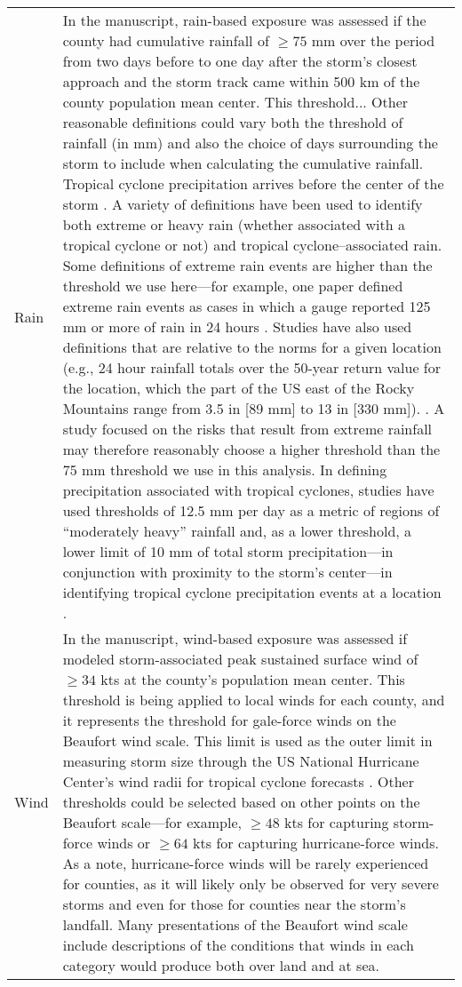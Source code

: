 \begin{table}
\begin{tabular}{lp{40em}}
Rain & In the manuscript, rain-based exposure was assessed if the county had cumulative rainfall of $\ge75$ mm over the period from two days before to one day after the storm’s closest approach and the storm track came within 500 km of the county population mean center. This threshold... Other reasonable definitions could vary both the threshold of rainfall (in mm) and also the choice of days surrounding the storm to include when calculating the cumulative rainfall. Tropical cyclone precipitation arrives before the center of the storm \cite{zhou2017spatial}. A variety of definitions have been used to identify both extreme or heavy rain (whether associated with a tropical cyclone or not) and tropical cyclone--associated rain. Some definitions of extreme rain events are higher than the threshold we use here---for example, one paper defined extreme rain events as cases in which a gauge reported 125 mm or more of rain in 24 hours \cite{schumacher2006characteristics}. Studies have also used definitions that are relative to the norms for a given location (e.g., 24 hour rainfall totals over the 50-year return value for the location, which the part of the US east of the Rocky Mountains range from 3.5 in [89 mm] to 13 in [330 mm]). \cite{schumacher2006characteristics, schumacher2005organization, stevenson201410}. A study focused on the risks that result from extreme rainfall may therefore reasonably choose a higher threshold than the 75 mm threshold we use in this analysis. In defining precipitation associated with tropical cyclones, studies have used thresholds of 12.5 mm per day as a metric of regions of ``moderately heavy'' rainfall \cite{zhou2017spatial} and, as a lower threshold, a lower limit of 10 mm of total storm precipitation---in conjunction with proximity to the storm's center---in identifying tropical cyclone precipitation events at a location \cite{feldmann2019estimation}. \\
Wind & In the manuscript, wind-based exposure was assessed if modeled storm-associated peak sustained surface wind of $\ge34$ kts at the county’s population mean center. This threshold is being applied to local winds for each county, and it represents the threshold for gale-force winds on the Beaufort wind scale. This limit is used as the outer limit in measuring storm size through the US National Hurricane Center's wind radii for tropical cyclone forecasts \cite{cangialosi2016examination}. Other thresholds could be selected based on other points on the Beaufort scale---for example, $\ge48$ kts for capturing storm-force winds or $\ge64$ kts for capturing hurricane-force winds. As a note, hurricane-force winds will be rarely experienced for counties, as it will likely only be observed for very severe storms and even for those for counties near the storm's landfall. Many presentations of the Beaufort wind scale include descriptions of the conditions that winds in each category would produce both over land and at sea.\\
\bottomrule
\end{tabular}
\end{table}
